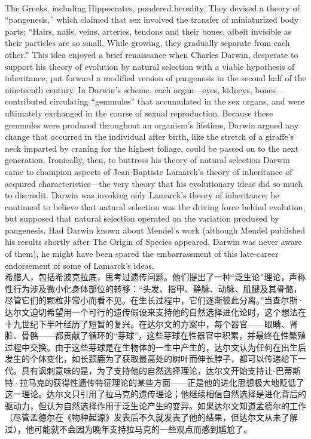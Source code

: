 \documentclass{article}
\begin{document}
\\
The Greeks, including Hippocrates, pondered heredity. They devised a theory of “pangenesis,” which claimed that sex involved the transfer of miniaturized body parts: “Hairs, nails, veins, arteries, tendons and their bones, albeit invisible as their particles are so small. While growing, they gradually separate from each other.” This idea enjoyed a brief renaissance when Charles Darwin, desperate to support his theory of evolution by natural selection with a viable hypothesis of inheritance, put forward a modified version of pangenesis in the second half of the nineteenth century. In Darwin’s scheme, each organ—eyes, kidneys, bones—contributed circulating “gemmules” that accumulated in the sex organs, and were ultimately exchanged in the course of sexual reproduction. Because these gemmules were produced throughout an organism’s lifetime, Darwin argued any change that occurred in the individual after birth, like the stretch of a giraffe’s neck imparted by craning for the highest foliage, could be passed on to the next generation. Ironically, then, to buttress his theory of natural selection Darwin came to champion aspects of Jean-Baptiste Lamarck’s theory of inheritance of acquired characteristics—the very theory that his evolutionary ideas did so much to discredit. Darwin was invoking only Lamarck’s theory of inheritance; he continued to believe that natural selection was the driving force behind evolution, but supposed that natural selection operated on the variation produced by pangenesis. Had Darwin known about Mendel’s work (although Mendel published his results shortly after The Origin of Species appeared, Darwin was never aware of them), he might have been spared the embarrassment of this late-career endorsement of some of Lamarck’s ideas.\\
希腊人，包括希波克拉底，思考过遗传问题。他们提出了一种“泛生论”理论，声称性行为涉及微小化身体部位的转移：“头发、指甲、静脉、动脉、肌腱及其骨骼，尽管它们的颗粒非常小而看不见。在生长过程中，它们逐渐彼此分离。”当查尔斯·达尔文迫切希望用一个可行的遗传假设来支持他的自然选择进化论时，这个想法在十九世纪下半叶经历了短暂的复兴。在达尔文的方案中，每个器官——眼睛、肾脏、骨骼——都贡献了循环的“芽球”，这些芽球在性器官中积累，并最终在性繁殖过程中交换。由于这些芽球是在生物体的一生中产生的，达尔文认为任何在出生后发生的个体变化，如长颈鹿为了获取最高处的树叶而伸长脖子，都可以传递给下一代。具有讽刺意味的是，为了支持他的自然选择理论，达尔文开始支持让-巴蒂斯特·拉马克的获得性遗传特征理论的某些方面——正是他的进化思想极大地贬低了这一理论。达尔文只引用了拉马克的遗传理论；他继续相信自然选择是进化背后的驱动力，但认为自然选择作用于泛生论产生的变异。如果达尔文知道孟德尔的工作（尽管孟德尔在《物种起源》发表后不久就发表了他的结果，但达尔文从未了解过），他可能就不会因为晚年支持拉马克的一些观点而感到尴尬了。\\
\end{document}

